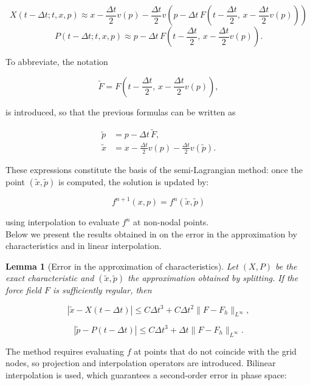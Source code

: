 \documentclass[11pt,a4paper,twoside,pdf]{article}
\numberwithin{equation}{section}
\newtheorem{lemma}[theorem]{Lemma}
\begin{document}
\[
X(t-\Delta t;t,x,p) \approx x
- \frac{\Delta t}{2}v(p)
- \frac{\Delta t}{2}v\!\left(p - \Delta t\,F\!\left(t-\frac{\Delta t}{2},\, x - \frac{\Delta t}{2}v(p)\right)\right)
\]
\[
P(t-\Delta t;t,x,p) \approx p
- \Delta t\,F\!\left(t-\frac{\Delta t}{2},\, x - \frac{\Delta t}{2}v(p)\right).
\]



To abbreviate, the notation


\[
\tilde{F} = F\!\left(t-\frac{\Delta t}{2},\, x - \frac{\Delta t}{2}v(p)\right),
\]

is introduced, so that the previous formulas can be written as


\[
\begin{aligned}
\tilde{p} &= p - \Delta t\,\tilde{F}, \\[0.3em]
\tilde{x} &= x - \frac{\Delta t}{2}v(p) - \frac{\Delta t}{2}v(\tilde{p}).
\end{aligned}
\]



These expressions constitute the basis of the semi-Lagrangian method: once
the point $(\tilde{x},\tilde{p})$ is computed, the solution is updated by:


\[
f^{n+1}(x,p) = f^{n}(\tilde{x},\tilde{p})
\]


using interpolation to evaluate $f^n$ at non-nodal points.\\


Below we present the results obtained in \cite{bostan2009convergence} on the error in the approximation by characteristics and in linear interpolation.

\begin{lemma}[Error in the approximation of characteristics]
Let $(X,P)$ be the exact characteristic and $(\tilde{x},\tilde{p})$ the approximation obtained by
splitting. If the force field $F$ is sufficiently regular, then


\[
|\tilde{x}-X(t-\Delta t)| \le C\Delta t^3 + C\Delta t^2\|F-F_h\|_{L^\infty},
\]




\[
|\tilde{p}-P(t-\Delta t)| \le C\Delta t^3 + \Delta t\|F-F_h\|_{L^\infty}.
\]


\end{lemma}






The method requires evaluating $f$ at points that do not coincide with the
grid nodes, so projection and interpolation operators are introduced. Bilinear
interpolation is used, which guarantees a second-order error in phase
space:
\end{document}
